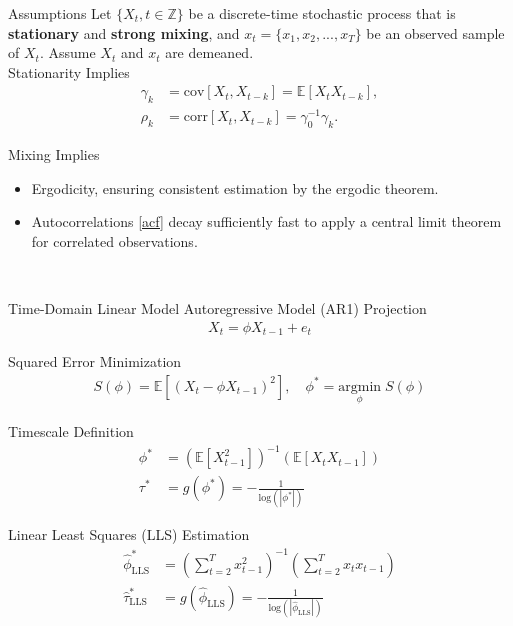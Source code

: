 \documentclass[8pt,aspectratio=169]{beamer}
\begin{document}
\begin{frame}{Assumptions}
Let $\{X_t, t\in \mathbb{Z}\}$ be a discrete-time stochastic process that is \textbf{stationary} and \textbf{strong mixing}, and $x_t = \{x_1, x_2, ..., x_T\}$ be an observed sample of $X_t$. Assume $X_t$ and $x_t$ are demeaned.\\
\vfill
Stationarity Implies
\begin{align}
    \gamma_k &= \text{cov}[X_t, X_{t-k}] = \mathbb{E}[X_t X_{t-k}],\\
    \rho_k &= \text{corr}[X_t, X_{t-k}] = \gamma_0^{-1}\gamma_k\label{acf}.
\end{align}

Mixing Implies
\begin{itemize}
    \item Ergodicity, ensuring consistent estimation by the ergodic theorem.
    \item Autocorrelations \eqref{acf} decay sufficiently fast to apply a central limit theorem for correlated observations.
\end{itemize}
\vfill
\citet{hansen_econometrics_2022, white_nonlinear_1984, newey_simple_1987}\\
\end{frame}

\begin{frame}{Time-Domain Linear Model}
\vfill
Autoregressive Model (AR1) Projection
\begin{align}
    X_t = \phi X_{t-1} + e_t
\end{align}

Squared Error Minimization
\begin{align}
    S(\phi) = \mathbb{E}[(X_t - \phi X_{t-1})^2],\quad \phi^* = \underset{\phi}{\text{argmin}} \; S(\phi)
\end{align}

Timescale Definition
\begin{align}
    \phi^* &= (\mathbb{E}[X_{t-1}^2])^{-1}(\mathbb{E}[X_t X_{t-1}])\\
    \tau^* &= g(\phi^*) = -\frac{1}{\text{log}(|\phi^*|)}
\end{align}

Linear Least Squares (LLS) Estimation
\begin{align}
    \hat\phi^*_{\scriptscriptstyle\text{LLS}} &= \left(\sum_{t=2}^T x_{t-1}^2\right)^{-1} \left(\sum_{t=2}^T x_t x_{t-1}\right)\\
    \hat\tau^*_{\scriptscriptstyle\text{LLS}} &= g(\hat\phi_{\scriptscriptstyle\text{LLS}}) = -\frac{1}{\text{log}(|\hat\phi_{\scriptscriptstyle\text{LLS}}|)}
\end{align}

\end{frame}
\end{document}
